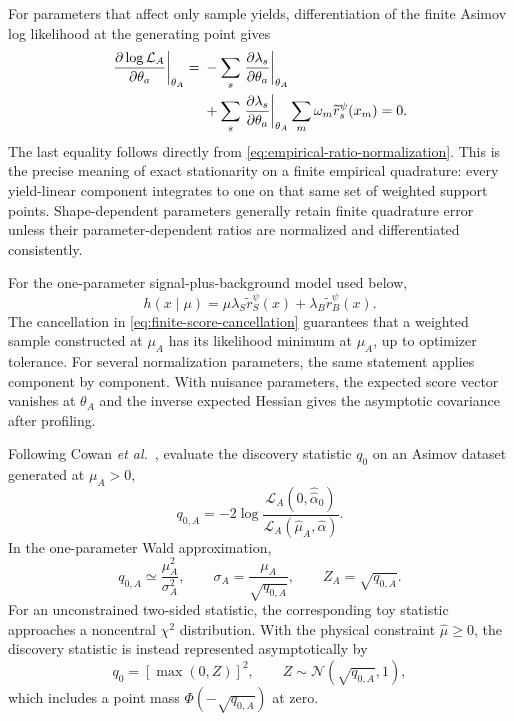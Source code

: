 \documentclass[
  aps,
  prd,
  superscriptaddress,
  nofootinbib,
  longbibliography,
  12pt
]{revtex4-2}
\newcommand{\Lcal}{\mathcal{L}}
\newcommand{\Normal}{\mathcal{N}}
\newcommand{\muhat}{\widehat\mu}
\begin{document}
For parameters that affect only sample yields, differentiation of the finite Asimov log likelihood at the generating point gives
\begin{align}
  \left.\frac{\partial\log\Lcal_A}{\partial\theta_a}
  \right|_{\theta_A}
  ={}&-\sum_s\left.\frac{\partial\lambda_s}{\partial\theta_a}
  \right|_{\theta_A}\notag\\
  &+\sum_s\left.\frac{\partial\lambda_s}{\partial\theta_a}
  \right|_{\theta_A}
  \sum_m\omega_m\widetilde r_s^\psi(x_m)=0.
  \label{eq:finite-score-cancellation}
\end{align}
The last equality follows directly from \cref{eq:empirical-ratio-normalization}.  This is the precise meaning of exact stationarity on a finite empirical quadrature: every yield-linear component integrates to one on that same set of weighted support points.  Shape-dependent parameters generally retain finite quadrature error unless their parameter-dependent ratios are normalized and differentiated consistently.

For the one-parameter signal-plus-background model used below,
\begin{equation}
  h(x\mid\mu)
  =\mu\lambda_S\widetilde r_S^\psi(x)
  +\lambda_B\widetilde r_B^\psi(x).
  \label{eq:mu-model}
\end{equation}
The cancellation in \cref{eq:finite-score-cancellation} guarantees that a weighted sample constructed at $\mu_A$ has its likelihood minimum at $\mu_A$, up to optimizer tolerance.  For several normalization parameters, the same statement applies component by component.  With nuisance parameters, the expected score vector vanishes at $\theta_A$ and the inverse expected Hessian gives the asymptotic covariance after profiling.

Following Cowan \emph{et al.}~\cite{Cowan:2010js}, evaluate the discovery statistic $q_0$ on an Asimov dataset generated at $\mu_A>0$,
\begin{equation}
  q_{0,A}=-2\log
  \frac{\Lcal_A(0,\widehat{\widehat\alpha}_0)}
       {\Lcal_A(\widehat\mu_A,\widehat\alpha)}.
\end{equation}
In the one-parameter Wald approximation,
\begin{equation}
  q_{0,A}\simeq\frac{\mu_A^2}{\sigma_A^2},
  \qquad
  \sigma_A=\frac{\mu_A}{\sqrt{q_{0,A}}},
  \qquad
  Z_A=\sqrt{q_{0,A}}.
  \label{eq:asimov-sigma}
\end{equation}
For an unconstrained two-sided statistic, the corresponding toy statistic approaches a noncentral $\chi^2$ distribution.  With the physical constraint $\muhat\geq0$, the discovery statistic is instead represented asymptotically by
\begin{equation}
  q_0=\left[\max(0,Z)\right]^2,
  \qquad Z\sim\Normal(\sqrt{q_{0,A}},1),
  \label{eq:boundary-q0}
\end{equation}
which includes a point mass $\Phi(-\sqrt{q_{0,A}})$ at zero.
\end{document}
